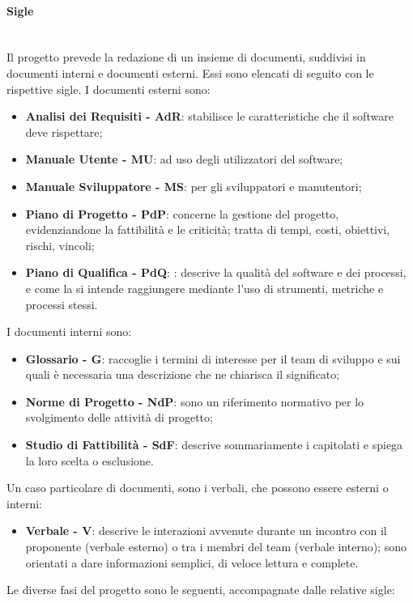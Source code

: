 		\paragraph{Sigle} \mbox{}\\
		Il progetto prevede la redazione di un insieme di documenti, suddivisi in documenti interni e documenti esterni. Essi sono elencati di seguito con le rispettive sigle.\newline
		I documenti esterni sono:	
		\begin{itemize}
			\item \textbf{Analisi dei Requisiti - AdR}: stabilisce le caratteristiche che il software deve rispettare;
			\item \textbf{Manuale Utente - MU}: ad uso degli utilizzatori del software;
			\item \textbf{Manuale Sviluppatore - MS}: per gli sviluppatori e manutentori;
			\item \textbf{Piano di Progetto - PdP}:  concerne la gestione del progetto, evidenziandone la fattibilità e le criticità; tratta di tempi, costi, obiettivi, rischi, vincoli;
			\item \textbf{Piano di Qualifica - PdQ}: : descrive la qualità del software e dei processi, e come la si intende raggiungere mediante l'uso di strumenti, metriche e processi stessi.
		\end{itemize}
		I documenti interni sono:
		\begin{itemize}
			\item \textbf{Glossario - G}: raccoglie i termini di interesse per il team di sviluppo e sui quali è necessaria una descrizione che ne chiarisca il significato;
			\item \textbf{Norme di Progetto - NdP}: sono un riferimento normativo per lo svolgimento delle attività di progetto;
			\item \textbf{Studio di Fattibilità - SdF}: descrive sommariamente i capitolati e spiega la loro scelta o esclusione.
		\end{itemize}
		Un caso particolare di documenti, sono i verbali, che possono essere esterni o interni:
		\begin{itemize}
			\item \textbf{Verbale - V}: descrive le interazioni avvenute durante un incontro con il proponente (verbale esterno) o tra i membri del team (verbale interno); sono orientati a dare informazioni semplici, di veloce lettura e complete.
		\end{itemize}
		Le diverse fasi del progetto sono le seguenti, accompagnate dalle relative sigle:

